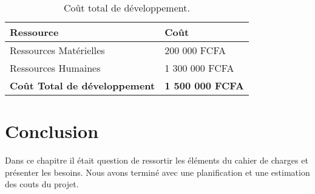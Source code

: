 \begin{table}[H]
    \centering
    \caption{Coût total de développement.}
    \begin{tabular}[t]{|p{8cm}|p{7.5cm}|} 
        \hline
        \textbf{Ressource} & \textbf{Coût} \\
        \hline\hline
        Ressources Matérielles & 200 000 FCFA \\
        \hline
        Ressources Humaines & 1 300 000 FCFA \\
        \hline
        \textbf{Coût Total de développement} & \textbf{1 500 000 FCFA} \\
        \hline\hline
    \end{tabular}
    \label{tab:couttotal}
\end{table}%



\section*{Conclusion}%
% 
Dans ce chapitre il était question de ressortir les éléments du cahier de charges et présenter les besoins. Nous avons terminé avec une planification et une estimation des couts du projet.